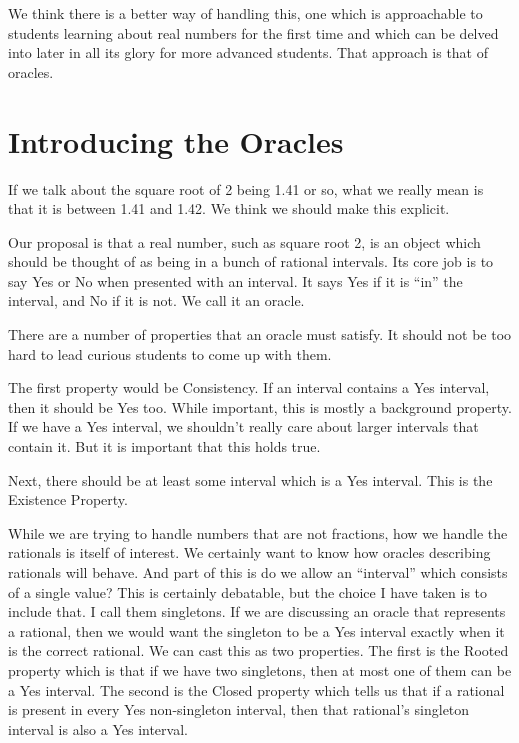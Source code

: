 \documentclass[12pt]{article}
\theoremstyle{remark}
\begin{document}
We think there is a better way of handling this, one which is approachable to students learning about real numbers for the first time and which can be delved into later in all its glory for more advanced students. That approach is that of oracles. 

\section{Introducing the Oracles}

If we talk about the square root of 2 being 1.41 or so, what we really mean is that it is between 1.41 and 1.42. We think we should make this explicit. 

Our proposal is that a real number, such as square root 2, is an object which should be thought of as being in a bunch of rational intervals. Its core job is to say Yes or No when presented with an interval. It says Yes if it is ``in'' the interval, and No if it is not. We call it an oracle. 

There are a number of properties that an oracle must satisfy. It should not be too hard to lead curious students to come up with them. 

The first property would be Consistency. If an interval contains a Yes interval, then it should be Yes too. While important, this is mostly a background property. If we have a Yes interval, we shouldn't really care about larger intervals that contain it. But it is important that this holds true. 

Next, there should be at least some interval which is a Yes interval. This is the Existence Property. 

While we are trying to handle numbers that are not fractions, how we handle the rationals is itself of interest. We certainly want to know how oracles describing rationals will behave. And part of this is do we allow an ``interval'' which consists of a single value? This is certainly debatable, but the choice I have taken is to include that. I call them singletons. If we are discussing an oracle that represents a rational, then we would want the singleton to be a Yes interval exactly when it is the correct rational. We can cast this as two properties. The first is the Rooted property which is that if we have two singletons, then at most one of them can be a Yes interval. The second is the Closed property which tells us that if a rational is present in every Yes non-singleton interval, then that rational's singleton interval is also a Yes interval. 
\end{document}

